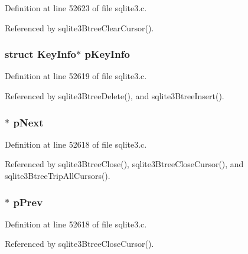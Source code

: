 Definition at line 52623 of file sqlite3.\+c.



Referenced by sqlite3\+Btree\+Clear\+Cursor().

\hypertarget{struct_bt_cursor_a0c73f46f09fcecfd9c8d29cd3cc7744d}{}
\subsubsection[{p\+Key\+Info}]{\setlength{\rightskip}{0pt plus 5cm}struct {\bf Key\+Info}$\ast$ p\+Key\+Info}\label{struct_bt_cursor_a0c73f46f09fcecfd9c8d29cd3cc7744d}


Definition at line 52619 of file sqlite3.\+c.



Referenced by sqlite3\+Btree\+Delete(), and sqlite3\+Btree\+Insert().

\hypertarget{struct_bt_cursor_a1dac2396746176f48a6d2eebfc765c17}{}
\subsubsection[{p\+Next}]{$\ast$ p\+Next}\label{struct_bt_cursor_a1dac2396746176f48a6d2eebfc765c17}


Definition at line 52618 of file sqlite3.\+c.



Referenced by sqlite3\+Btree\+Close(), sqlite3\+Btree\+Close\+Cursor(), and sqlite3\+Btree\+Trip\+All\+Cursors().

\hypertarget{struct_bt_cursor_a28e43147b02ff3745de0afb619d64c25}{}
\subsubsection[{p\+Prev}]{ $\ast$ p\+Prev}\label{struct_bt_cursor_a28e43147b02ff3745de0afb619d64c25}


Definition at line 52618 of file sqlite3.\+c.



Referenced by sqlite3\+Btree\+Close\+Cursor().

\hypertarget{struct_bt_cursor_ad37941f0529357971cb490f54966185b}{}
